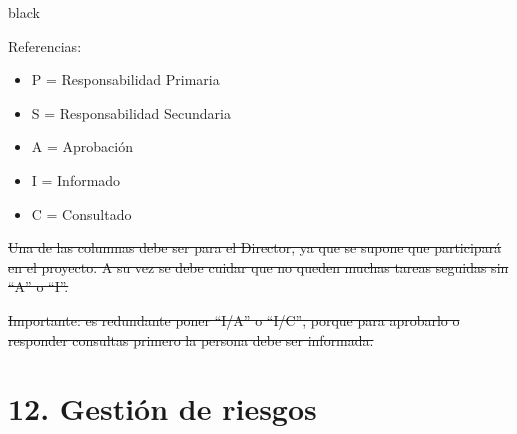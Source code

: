 \documentclass[11pt]{charter}
\providecommand{\DIFdel}[1]{{\protect\color{red}\sout{#1}}}                      %
\providecommand{\DIFdelbegin}{} %
\providecommand{\DIFdelend}{} %
\begin{document}
\begin{consigna}{black}
{\footnotesize
Referencias:
\begin{itemize}
	\item P = Responsabilidad Primaria
	\item S = Responsabilidad Secundaria
	\item A = Aprobación
	\item I = Informado
	\item C = Consultado
\end{itemize}
} %
\DIFdelbegin %

\DIFdel{Una de las columnas debe ser para el Director, ya que se supone que participará en el proyecto.
A su vez se debe cuidar que no queden muchas tareas seguidas sin ``A'' o ``I''.
}%

\DIFdel{Importante: es redundante poner ``I/A'' o ``I/C'', porque para aprobarlo o responder consultas primero la persona debe ser informada.
}%

\DIFdelend \end{consigna}

\section{12. Gestión de riesgos}
\label{sec:riesgos}
\end{document}

